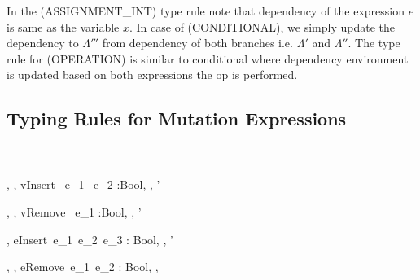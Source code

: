 In the (ASSIGNMENT\_INT) type rule note that dependency of the expression $e$ is same as the variable $x$. In case of (CONDITIONAL), we simply update the dependency to $\Lambda'''$ from dependency of both branches i.e. $\Lambda'$ and $\Lambda''$. The type rule for (OPERATION) is similar to conditional where dependency environment is updated based on both expressions the op is performed.\\    

 \subsection{Typing Rules for Mutation Expressions}
\label{subsec:standardRules}
\ \\
\ \\
    {\Gamma, \Lambda, \Delta \vdash vInsert \ e_1 \ e_2 :Bool, \Lambda, \Delta'}
    
    {\Gamma, \Lambda, \Delta \vdash vRemove \ e_1 :Bool, \Lambda, \Delta'}
    
    {\Gamma, \Lambda \Delta \vdash eInsert\ e_1\ e_2\ e_3 : Bool, \Lambda, \Delta'}

    {\Gamma, \Lambda, \Delta \vdash eRemove\ e_1\ e_2 : Bool, \Lambda, \Delta}
        
